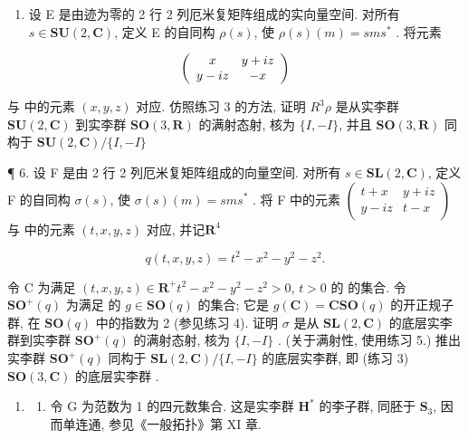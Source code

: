 \begin{enumerate}
\def\labelenumi{\arabic{enumi}.}
\setcounter{enumi}{4}
\tightlist
\item
  设 E 是由迹为零的 2 行 2 列厄米复矩阵组成的实向量空间. 对所有 \(s \in \mathbf{SU}(2, \mathbf{C})\), 定义 E 的自同构 \(\rho(s)\), 使 \(\rho(s)(m) = sms^*\) . 将元素
\end{enumerate}

\[
\left( \begin{array}{c c} x & y + i z \\ y - i z & - x \end{array} \right)
\]

与  中的元素 \((x,y,z)\) 对应. 仿照练习 3 的方法, 证明 \(R^{3}\)\(\rho\) 是从实李群 \(\mathbf{SU}(2,\mathbf{C})\) 到实李群 \(\mathbf{SO}(3,\mathbf{R})\) 的满射态射, 核为 \(\{I,-I\}\), 并且 \(\mathbf{SO}(3,\mathbf{R})\) 同构于 \(\mathbf{SU}(2,\mathbf{C})/\{I,-I\}\)

¶ 6. 设 F 是由 2 行 2 列厄米复矩阵组成的向量空间. 对所有 \(s \in \mathbf{SL}(2, \mathbf{C})\), 定义 F 的自同构 \(\sigma(s)\), 使 \(\sigma(s)(m) = sms^*\) . 将 F 中的元素 \(\begin{pmatrix} t + x & y + iz \\ y - iz & t - x \end{pmatrix}\) 与  中的元素 \((t, x, y, z)\) 对应, 并记\(\mathbf{R}^4\)

\[
q (t, x, y, z) = t ^ {2} - x ^ {2} - y ^ {2} - z ^ {2}.
\]

令 C 为满足 \((t, x, y, z) \in \mathbf{R}^+\)\(t^2 - x^2 - y^2 - z^2 > 0\), \(t > 0\) 的  的集合. 令 \(\mathbf{SO}^+(q)\) 为满足  的 \(g \in \mathbf{SO}(q)\) 的集合; 它是 \(g(\mathbf{C}) = \mathbf{C}\)\(\mathbf{SO}(q)\) 的开正规子群, 在 \(\mathbf{SO}(q)\) 中的指数为 2 (参见练习 4). 证明 \(\sigma\) 是从 \(\mathbf{SL}(2, \mathbf{C})\) 的底层实李群到实李群 \(\mathbf{SO}^+(q)\) 的满射态射, 核为 \(\{I, -I\}\) . (关于满射性, 使用练习 5.) 推出实李群 \(\mathbf{SO}^+(q)\) 同构于 \(\mathbf{SL}(2, \mathbf{C}) / \{I, -I\}\) 的底层实李群, 即 (练习 3) \(\mathbf{SO}(3, \mathbf{C})\) 的底层实李群 .

\begin{enumerate}
\def\labelenumi{\arabic{enumi}.}
\setcounter{enumi}{6}
\tightlist
\item
  \begin{enumerate}
  \def\labelenumii{(\alph{enumii})}
  \tightlist
  \item
    令 G 为范数为 1 的四元数集合. 这是实李群 \(\mathbf{H}^*\) 的李子群, 同胚于 \(\mathbf{S}_3\), 因而单连通, 参见《一般拓扑》第 XI 章.
  \end{enumerate}
\end{enumerate}

